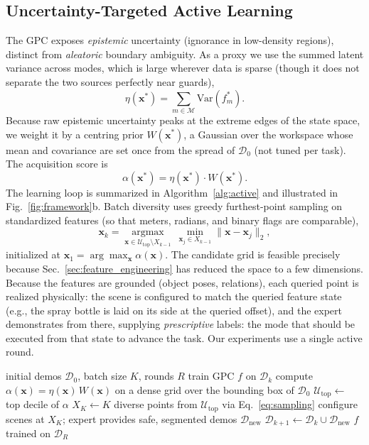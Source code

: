 \subsection{Uncertainty-Targeted Active Learning}
\label{sec:active}
The GPC exposes \emph{epistemic} uncertainty (ignorance in low-density regions), distinct from \emph{aleatoric} boundary ambiguity. As a proxy we use the summed latent variance across modes, which is large wherever data is sparse (though it does not separate the two sources perfectly near guards),
\begin{equation}
\eta(\mathbf{x}^*)=\sum_{m\in\mathcal{M}}\text{Var}(f^*_m).
\end{equation}
Because raw epistemic uncertainty peaks at the extreme edges of the state space, we weight it by a centring prior $W(\mathbf{x}^*)$, a Gaussian over the workspace whose mean and covariance are set once from the spread of $\mathcal{D}_{0}$ (not tuned per task). The acquisition score is
\begin{equation}
\alpha(\mathbf{x}^*)=\eta(\mathbf{x}^*)\cdot W(\mathbf{x}^*).
\end{equation}
The learning loop is summarized in Algorithm~\ref{alg:active} and illustrated in Fig.~\ref{fig:framework}b. Batch diversity uses greedy furthest-point sampling on standardized features (so that meters, radians, and binary flags are comparable),
\begin{equation}\label{eq:sampling}
\mathbf{x}_k=\operatorname*{argmax}_{\mathbf{x}\in\mathcal{U}_{\text{top}}\setminus X_{k-1}}\ \min_{\mathbf{x}_j\in X_{k-1}}\|\mathbf{x}-\mathbf{x}_j\|_2,
\end{equation}
initialized at $\mathbf{x}_1=\arg\max_{\mathbf{x}}\alpha(\mathbf{x})$. The candidate grid is feasible precisely because Sec.~\ref{sec:feature_engineering} has reduced the space to a few dimensions. Because the features are grounded (object poses, relations), each queried point is realized physically: the scene is configured to match the queried feature state (e.g., the spray bottle is laid on its side at the queried offset), and the expert demonstrates from there, supplying \emph{prescriptive} labels: the mode that should be executed from that state to advance the task. Our experiments use a single active round.

\begin{algorithm}
\caption{Uncertainty-Targeted Active Learning}\label{alg:active}
\begin{algorithmic}[1]
\Require initial demos $\mathcal{D}_{0}$, batch size $K$, rounds $R$
\State train GPC $f$ on $\mathcal{D}_{k}$
\State compute $\alpha(\mathbf{x})=\eta(\mathbf{x})\,W(\mathbf{x})$ on a dense grid over the bounding box of $\mathcal{D}_{0}$
\State $\mathcal{U}_{\text{top}}\gets$ top decile of $\alpha$
\State $X_K\gets K$ diverse points from $\mathcal{U}_{\text{top}}$ via Eq.~\eqref{eq:sampling}
\State configure scenes at $X_K$; expert provides safe, segmented demos $\mathcal{D}_{\text{new}}$
\State $\mathcal{D}_{k+1}\gets\mathcal{D}_{k}\cup\mathcal{D}_{\text{new}}$
\EndFor
\State \Return $f$ trained on $\mathcal{D}_{R}$
\end{algorithmic}
\end{algorithm}


